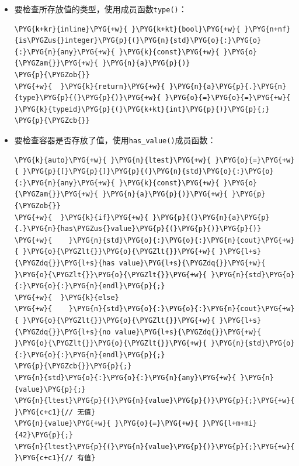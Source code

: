 \begin{itemize}

\item 要检查所存放值的类型，使用成员函数\texttt{type()}：



\begin{codeblockbg}
\begin{Verbatim}[commandchars=\\\{\},breaklines=true,breakanywhere=true,fontsize=\codefont,xleftmargin=17bp]
\PYG{k+kr}{inline}\PYG{+w}{ }\PYG{k+kt}{bool}\PYG{+w}{ }\PYG{n+nf}{is\PYGZus{}integer}\PYG{p}{(}\PYG{n}{std}\PYG{o}{:}\PYG{o}{:}\PYG{n}{any}\PYG{+w}{ }\PYG{k}{const}\PYG{+w}{ }\PYG{o}{\PYGZam{}}\PYG{+w}{ }\PYG{n}{a}\PYG{p}{)}
\PYG{p}{\PYGZob{}}
\PYG{+w}{  }\PYG{k}{return}\PYG{+w}{ }\PYG{n}{a}\PYG{p}{.}\PYG{n}{type}\PYG{p}{(}\PYG{p}{)}\PYG{+w}{ }\PYG{o}{=}\PYG{o}{=}\PYG{+w}{ }\PYG{k}{typeid}\PYG{p}{(}\PYG{k+kt}{int}\PYG{p}{)}\PYG{p}{;}
\PYG{p}{\PYGZcb{}}
\end{Verbatim}
\end{codeblockbg}



\item 要检查容器是否存放了值，使用\texttt{has\_\allowbreak{}value()}成员函数：



\begin{codeblockbg}
\begin{Verbatim}[commandchars=\\\{\},breaklines=true,breakanywhere=true,fontsize=\codefont,xleftmargin=17bp]
\PYG{k}{auto}\PYG{+w}{ }\PYG{n}{ltest}\PYG{+w}{ }\PYG{o}{=}\PYG{+w}{ }\PYG{p}{[}\PYG{p}{]}\PYG{p}{(}\PYG{n}{std}\PYG{o}{:}\PYG{o}{:}\PYG{n}{any}\PYG{+w}{ }\PYG{k}{const}\PYG{+w}{ }\PYG{o}{\PYGZam{}}\PYG{+w}{ }\PYG{n}{a}\PYG{p}{)}\PYG{+w}{ }\PYG{p}{\PYGZob{}}
\PYG{+w}{  }\PYG{k}{if}\PYG{+w}{ }\PYG{p}{(}\PYG{n}{a}\PYG{p}{.}\PYG{n}{has\PYGZus{}value}\PYG{p}{(}\PYG{p}{)}\PYG{p}{)}
\PYG{+w}{    }\PYG{n}{std}\PYG{o}{:}\PYG{o}{:}\PYG{n}{cout}\PYG{+w}{ }\PYG{o}{\PYGZlt{}}\PYG{o}{\PYGZlt{}}\PYG{+w}{ }\PYG{l+s}{\PYGZdq{}}\PYG{l+s}{has value}\PYG{l+s}{\PYGZdq{}}\PYG{+w}{ }\PYG{o}{\PYGZlt{}}\PYG{o}{\PYGZlt{}}\PYG{+w}{ }\PYG{n}{std}\PYG{o}{:}\PYG{o}{:}\PYG{n}{endl}\PYG{p}{;}
\PYG{+w}{  }\PYG{k}{else}
\PYG{+w}{    }\PYG{n}{std}\PYG{o}{:}\PYG{o}{:}\PYG{n}{cout}\PYG{+w}{ }\PYG{o}{\PYGZlt{}}\PYG{o}{\PYGZlt{}}\PYG{+w}{ }\PYG{l+s}{\PYGZdq{}}\PYG{l+s}{no value}\PYG{l+s}{\PYGZdq{}}\PYG{+w}{ }\PYG{o}{\PYGZlt{}}\PYG{o}{\PYGZlt{}}\PYG{+w}{ }\PYG{n}{std}\PYG{o}{:}\PYG{o}{:}\PYG{n}{endl}\PYG{p}{;}
\PYG{p}{\PYGZcb{}}\PYG{p}{;}
\PYG{n}{std}\PYG{o}{:}\PYG{o}{:}\PYG{n}{any}\PYG{+w}{ }\PYG{n}{value}\PYG{p}{;}
\PYG{n}{ltest}\PYG{p}{(}\PYG{n}{value}\PYG{p}{)}\PYG{p}{;}\PYG{+w}{ }\PYG{c+c1}{// 无值}
\PYG{n}{value}\PYG{+w}{ }\PYG{o}{=}\PYG{+w}{ }\PYG{l+m+mi}{42}\PYG{p}{;}
\PYG{n}{ltest}\PYG{p}{(}\PYG{n}{value}\PYG{p}{)}\PYG{p}{;}\PYG{+w}{ }\PYG{c+c1}{// 有值}
\end{Verbatim}
\end{codeblockbg}



\end{itemize}
